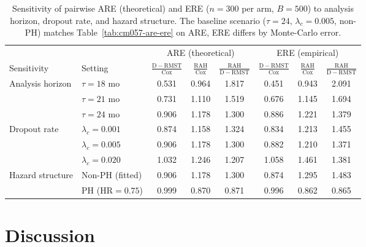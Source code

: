 \documentclass[12pt]{article}
\begin{document}
 \begin{table}[ht]
\centering
\caption{Sensitivity of pairwise ARE (theoretical) and ERE ($n=300$ per arm,
  $B=500$) to analysis horizon, dropout rate, and hazard structure.
  The baseline scenario ($\tau=24$, $\lambda_c=0.005$, non-PH) matches
  Table~\ref{tab:cm057-are-ere} on ARE, ERE differs by Monte-Carlo error.}
\label{tab:sens-are}
\medskip
\begin{tabular}{llcccccc}
\toprule
& & \multicolumn{3}{c}{ARE (theoretical)} & \multicolumn{3}{c}{ERE (empirical)} \\
\cmidrule(lr){3-5}\cmidrule(lr){6-8}
Sensitivity & Setting & $\frac{\mathrm{D-RMST}}{\mathrm{Cox}}$ & $\frac{\mathrm{RAH}}{\mathrm{Cox}}$ & $\frac{\mathrm{RAH}}{\mathrm{D-RMST}}$ & $\frac{\mathrm{D-RMST}}{\mathrm{Cox}}$ & $\frac{\mathrm{RAH}}{\mathrm{Cox}}$ & $\frac{\mathrm{RAH}}{\mathrm{D-RMST}}$ \\
\midrule
\multirow{3}{*}{Analysis horizon} & $\tau=18$ mo & 0.531 & 0.964 & 1.817 & 0.451 & 0.943 & 2.091 \\
 & $\tau=21$ mo & 0.731 & 1.110 & 1.519 & 0.676 & 1.145 & 1.694 \\
 & $\tau=24$ mo & 0.906 & 1.178 & 1.300 & 0.886 & 1.221 & 1.379 \\
\midrule
\multirow{3}{*}{Dropout rate} & $\lambda_c=0.001$ & 0.874 & 1.158 & 1.324 & 0.834 & 1.213 & 1.455 \\
 & $\lambda_c=0.005$ & 0.906 & 1.178 & 1.300 & 0.882 & 1.210 & 1.371 \\
 & $\lambda_c=0.020$ & 1.032 & 1.246 & 1.207 & 1.058 & 1.461 & 1.381 \\
\midrule
\multirow{2}{*}{Hazard structure} & Non-PH (fitted) & 0.906 & 1.178 & 1.300 & 0.874 & 1.295 & 1.483 \\
 & PH ($\mathrm{HR}=0.75$) & 0.999 & 0.870 & 0.871 & 0.996 & 0.862 & 0.865 \\
\bottomrule
\end{tabular}
\end{table}


\section{Discussion}
\label{sec:discussion}
\end{document}
